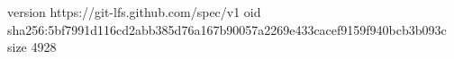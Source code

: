 version https://git-lfs.github.com/spec/v1
oid sha256:5bf7991d116cd2abb385d76a167b90057a2269e433cacef9159f940bcb3b093c
size 4928
